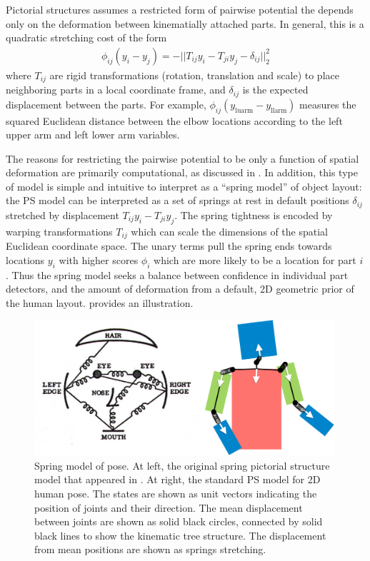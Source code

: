  Pictorial structures assumes a restricted form of 
pairwise potential the depends only on the deformation between kinematially 
attached parts. In general, this is a quadratic stretching cost of the form 
\begin{align} \label{eq:springcost}
\phi_{ij}(y_i-y_j) = -||T_{ij} y_i - T_{ji} y_j - \delta_{ij} ||_2^2 
\end{align}
where $T_{ij}$ are rigid transformations (rotation, translation and scale) to 
place neighboring parts in a local coordinate frame, and $\delta_{ij}$ is the 
expected displacement between the parts.  For example, 
$\phi_{ij}(y_{\text{luarm}} - y_{\text{llarm}})$ measures the squared Euclidean 
distance between the elbow locations according to the left upper arm and left 
lower arm variables.  

 The reasons for restricting the pairwise 
potential to be only a function of spatial deformation are primarily 
computational, as discussed in .  In addition, this type of model is 
simple and intuitive to interpret as a ``spring model'' of object layout: the 
PS model can be interpreted as a set of springs at rest in default positions 
$\delta_{ij}$ stretched by displacement $T_{ij} y_i - T_{ji}y_j $.  The spring 
tightness is encoded by warping transformations $T_{ij}$ which can scale the 
dimensions of the spatial Euclidean coordinate space.  The unary terms pull the 
spring ends towards locations $y_i$ with higher scores $\phi_i$ which are more 
likely to be a location for part $i$.  Thus the spring model seeks a balance 
between confidence in individual part detectors, and the amount of deformation 
from a default, 2D geometric prior of the human layout.   
provides an illustration.

\begin{figure}[tb]
\begin{center}
\includegraphics[width=0.99\textwidth]{figs/spring-model.pdf}
\caption[Spring model of pose.]{Spring model of pose.  At left, the original 
spring pictorial structure model that appeared in \citet{fischler1973ps}. At 
right, the standard PS model for 2D human pose.  The states are shown as unit 
vectors indicating the position of joints and their direction.  The mean 
displacement between joints are shown as solid black circles, connected by 
solid black lines to show the kinematic tree structure.  The displacement from 
mean positions are shown as springs stretching.}
\label{fig:spring-model}
\end{center}
\end{figure}

